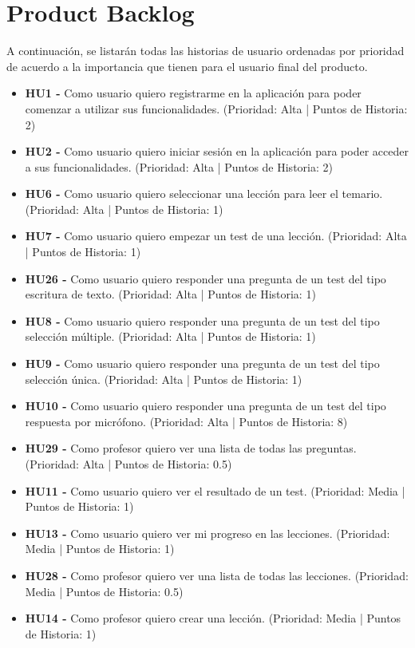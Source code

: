 \section{Product Backlog}
A continuación, se listarán todas las historias de usuario ordenadas por prioridad de acuerdo a la importancia que tienen para el usuario final del producto.
\begin{itemize}
    \item \textbf{HU1 - } Como usuario quiero registrarme en la aplicación para poder comenzar a utilizar sus funcionalidades. (Prioridad: Alta | Puntos de Historia: 2)
    \item \textbf{HU2 - } Como usuario quiero iniciar sesión en la aplicación para poder acceder a sus funcionalidades. (Prioridad: Alta | Puntos de Historia: 2)
    \item \textbf{HU6 - } Como usuario quiero seleccionar una lección para leer el temario. (Prioridad: Alta | Puntos de Historia: 1)
    \item \textbf{HU7 - } Como usuario quiero empezar un test de una lección. (Prioridad: Alta | Puntos de Historia: 1)
    \item \textbf{HU26 - } Como usuario quiero responder una pregunta de un test del tipo escritura de texto. (Prioridad: Alta | Puntos de Historia: 1)
    \item \textbf{HU8 - } Como usuario quiero responder una pregunta de un test del tipo selección múltiple. (Prioridad: Alta | Puntos de Historia: 1)
    \item \textbf{HU9 - } Como usuario quiero responder una pregunta de un test del tipo selección única. (Prioridad: Alta | Puntos de Historia: 1)
    \item \textbf{HU10 - } Como usuario quiero responder una pregunta de un test del tipo respuesta por micrófono. (Prioridad: Alta | Puntos de Historia: 8)
    \item \textbf{HU29 - } Como profesor quiero ver una lista de todas las preguntas. (Prioridad: Alta | Puntos de Historia: 0.5)
    \item \textbf{HU11 - } Como usuario quiero ver el resultado de un test. (Prioridad: Media | Puntos de Historia: 1)
    \item \textbf{HU13 - } Como usuario quiero ver mi progreso en las lecciones. (Prioridad: Media | Puntos de Historia: 1)
    \item \textbf{HU28 - } Como profesor quiero ver una lista de todas las lecciones. (Prioridad: Media | Puntos de Historia: 0.5)
    \item \textbf{HU14 - } Como profesor quiero crear una lección. (Prioridad: Media | Puntos de Historia: 1)

\end{itemize}
